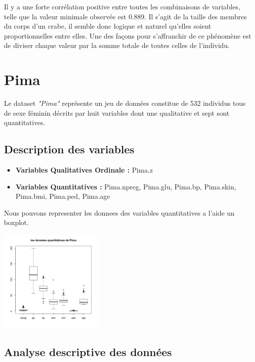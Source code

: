 \documentclass[]{report}
\begin{document}
Il y a une forte corrélation positive entre toutes les combinaisons de variables, telle que la valeur minimale observée est 0.889. 
Il s'agit de la taille des membres du corps d'un crabe, il semble donc logique et naturel qu'elles soient proportionnelles entre elles.
Une des façons pour s'affranchir de ce phénomène est de diviser chaque valeur par la somme totale de toutes celles de l'individu.


\section{Pima}
Le dataset \textit{"Pima"} représente un jeu de données constitue de 532 individus tous de sexe féminin décrits par huit variables dont une qualitative et sept sont quantitatives.

\subsection{Description des variables}


\begin{itemize}
	\item \textbf{Variables Qualitatives Ordinale :}  Pima.z
	\item \textbf{Variables Quantitatives : } Pima.npreg, Pima.glu, Pima.bp, Pima.skin, Pima.bmi, Pima.ped, Pima.age
\end{itemize}

Nous pouvons representer les donnees des variables quantitatives a l'aide un boxplot.
\begin{center}
	\includegraphics[width=50mm]{Figures/Pima/bxp_Pimaquant.png}
	\label{fig:boxplot_pima_quantitatives}
\end{center}

\subsection{Analyse descriptive des données}
\end{document}
